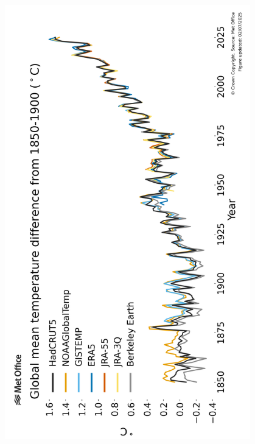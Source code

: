 \documentclass[12pt]{article}
\begin{document}
\begin{enumerate}
%	
	

\end{enumerate}


\newpage

\begin{center}
\includegraphics[width=0.8\textwidth]{images/global-average-temperature_met-office_2025-09_rotated.png}
\end{center}
\end{document}

